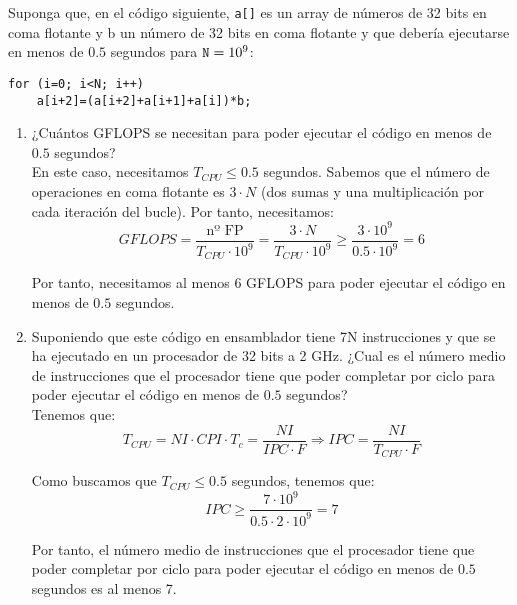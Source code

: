 \begin{ejercicio}
    Suponga que, en el código siguiente, \verb|a[]| es un array de números de 32 bits en coma flotante y b
    un número de 32 bits en coma flotante y que debería ejecutarse en menos de $0.5$ segundos para $\verb|N|=10^9$:
    \begin{verbatim}
for (i=0; i<N; i++)
    a[i+2]=(a[i+2]+a[i+1]+a[i])*b;
    \end{verbatim}

    \begin{enumerate}
        \item ¿Cuántos GFLOPS se necesitan para poder ejecutar el código en menos de $0.5$ segundos?\\
        
        En este caso, necesitamos $T_{CPU} \leq 0.5$ segundos. Sabemos que el número de operaciones en coma flotante es $3\cdot N$ (dos sumas y una multiplicación por cada iteración del bucle). Por tanto, necesitamos:
        \begin{equation*}
            GFLOPS = \dfrac{\text{nº FP}}{T_{CPU}\cdot 10^9} = \dfrac{3\cdot N}{T_{CPU}\cdot 10^9} \geq \dfrac{3\cdot 10^9}{0.5\cdot 10^9} = 6
        \end{equation*}

        Por tanto, necesitamos al menos 6 GFLOPS para poder ejecutar el código en menos de $0.5$ segundos.

        \item Suponiendo que este código en ensamblador tiene 7N instrucciones y que se ha ejecutado en un
        procesador de 32 bits a 2 GHz. ¿Cual es el número medio de instrucciones que el procesador tiene que poder
        completar por ciclo para poder ejecutar el código en menos de $0.5$ segundos?\\

        Tenemos que:
        \begin{equation*}
            T_{CPU} = NI \cdot CPI \cdot T_c = \dfrac{NI}{IPC \cdot F}
            \Longrightarrow IPC = \dfrac{NI}{T_{CPU}\cdot F}
        \end{equation*}

        Como buscamos que $T_{CPU} \leq 0.5$ segundos, tenemos que:
        \begin{equation*}
            IPC \geq \dfrac{7\cdot 10^9}{0.5\cdot 2\cdot 10^9} = 7
        \end{equation*}

        Por tanto, el número medio de instrucciones que el procesador tiene que poder completar por ciclo para poder ejecutar el código en menos de $0.5$ segundos es al menos 7.
        

\end{enumerate}
\end{ejercicio}
